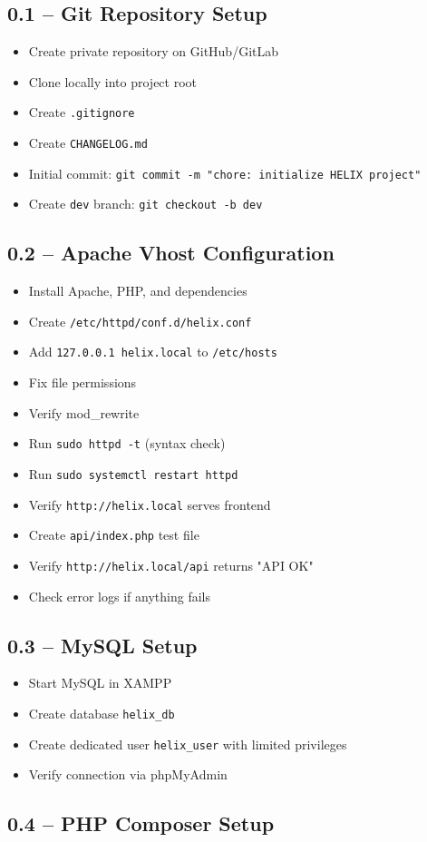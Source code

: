 \documentclass[11pt,a4paper]{article}
\newcommand{\undone}{\textcolor{helixgray}{\texttt{[ ] }}}
\newcommand{\done}{\textcolor{helixteal}{\textbf{[x] }}}
\newcommand{\filepath}[1]{\texttt{\small#1}}
\newcommand{\task}[2]{\item[#1] #2}
\begin{document}
\subsection{0.1 -- Git Repository Setup}

\begin{itemize}
    \task{\done}{Create private repository on GitHub/GitLab}
    \task{\done}{Clone locally into project root}
    \task{\done}{Create \filepath{.gitignore}}
    \task{\undone}{Create \filepath{CHANGELOG.md}}
    \task{\undone}{Initial commit: \texttt{git commit -m "chore: initialize HELIX project"}}
    \task{\undone}{Create \texttt{dev} branch: \texttt{git checkout -b dev}}
\end{itemize}

\subsection{0.2 -- Apache Vhost Configuration}

\begin{itemize}
    \task{\done}{Install Apache, PHP, and dependencies}
    \task{\done}{Create \filepath{/etc/httpd/conf.d/helix.conf}}
    \task{\done}{Add \texttt{127.0.0.1 helix.local} to \filepath{/etc/hosts}}
    \task{\done}{Fix file permissions}
    \task{\done}{Verify mod\_rewrite}
    \task{\done}{Run \texttt{sudo httpd -t} (syntax check)}
    \task{\done}{Run \texttt{sudo systemctl restart httpd}}
    \task{\done}{Verify \texttt{http://helix.local} serves frontend}
    \task{\done}{Create \filepath{api/index.php} test file}
    \task{\done}{Verify \texttt{http://helix.local/api} returns "API OK"}
    \task{\done}{Check error logs if anything fails}
\end{itemize}

\subsection{0.3 -- MySQL Setup}

\begin{itemize}
    \task{\done}{Start MySQL in XAMPP}
    \task{\done}{Create database \texttt{helix\_db}}
    \task{\done}{Create dedicated user \texttt{helix\_user} with limited privileges}
    \task{\done}{Verify connection via phpMyAdmin}
\end{itemize}

\subsection{0.4 -- PHP Composer Setup}
\end{document}
